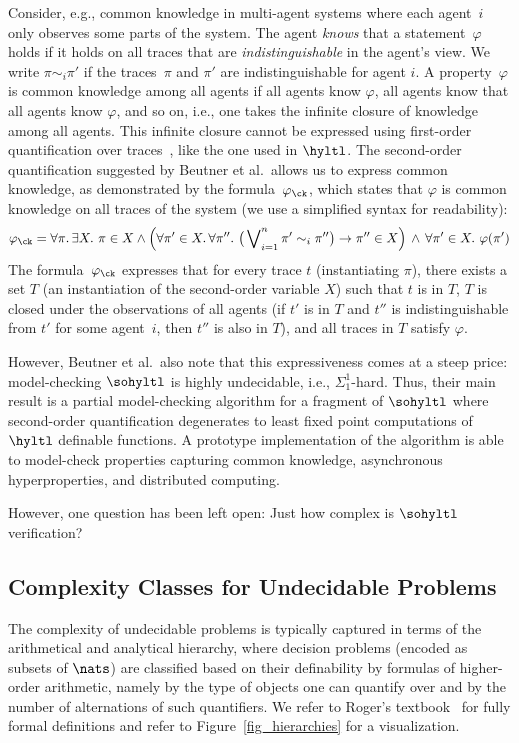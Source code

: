 Consider, e.g., common knowledge in multi-agent systems where each agent~$i$ only observes some parts of the system. The agent \emph{knows} that a statement~$\varphi$ holds if it holds on all traces that are \emph{indistinguishable} in the agent's view. 
We write $\pi \sim_i \pi'$ if the traces~$\pi$ and $\pi'$ are indistinguishable for agent $i$. 
A property~$\varphi$ is common knowledge among all agents if all agents know $\varphi$, all agents know that all agents know $\varphi$, and so on, i.e., one takes the infinite closure of knowledge among all agents. 
This infinite closure cannot be expressed using first-order quantification over traces~\cite{DBLP:conf/fossacs/BozzelliMP15}, like the one used in $\hyltl$. 
The second-order quantification suggested by Beutner et al.\ allows us to express common knowledge, as demonstrated by the formula~$\varphi_\ck$, which 
 states that $\varphi$ is common knowledge on all traces of the system (we use a simplified syntax for readability): 
\begin{align*}
   \varphi_\ck =  \forall \pi.\, \exists X .\ \pi \in X \land \Big( \forall \pi' \in X.\, \forall \pi''.\ \big(\bigvee\nolimits_{i=1}^n \pi' \sim_i \pi'' \big) \rightarrow \pi'' \in X \Big)\, \land\, \forall \pi' \in X.\ \varphi({\pi'})
\end{align*}
The formula~$\varphi_\ck$ expresses that for every trace $t$ (instantiating $\pi$), there exists a set $T$ (an instantiation of the second-order variable $X$) such that $t$ is in $T$, $T$ is closed under the observations of all agents (if $t'$ is in $T$ and $t''$ is indistinguishable from $t'$ for some agent~$i$, then $t''$ is also in $T$), and all traces in $T$ satisfy $\varphi$.  

However, Beutner et al.\ also note that this expressiveness comes at a steep price:
model-checking $\sohyltl$ is highly undecidable, i.e., $\Sigma_1^1$-hard.
Thus, their main result is a partial model-checking algorithm for a fragment of $\sohyltl$ where second-order quantification degenerates to least fixed point computations of $\hyltl$ definable functions. 
A prototype implementation of the algorithm is able to model-check properties capturing common knowledge, asynchronous hyperproperties, and distributed computing. %

However, one question has been left open: Just how complex is $\sohyltl$ verification?

\subsection{Complexity Classes for Undecidable Problems}
The complexity of undecidable problems is typically captured in terms of the arithmetical and analytical hierarchy, where decision problems (encoded as subsets of $\nats$) are classified based on their definability by formulas of higher-order arithmetic, namely by the type of objects one can quantify over and by the number of alternations of such quantifiers.
We refer to Roger's textbook~\cite{Rogers87} for fully formal definitions and refer to Figure~\ref{fig_hierarchies} for a visualization.

